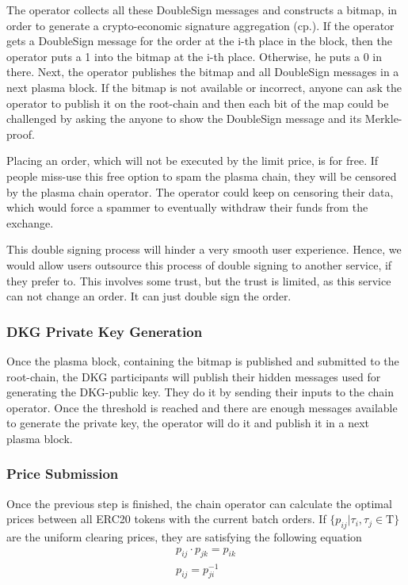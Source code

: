 \documentclass[11pt,parskip=full]{scrartcl}%
\newcommand{\Tau}{\mathrm{T}}
\begin{document}
The operator collects all these DoubleSign messages and constructs a bitmap, in order to generate a crypto-economic signature aggregation (cp.\cite{sig}). 
If the operator gets a DoubleSign message for the order at the i-th place in the block, then the operator puts a 1 into the bitmap at the i-th place. 
Otherwise, he puts a 0 in there.
Next, the operator publishes the bitmap and all DoubleSign messages in a next plasma block. 
If the bitmap is not available or incorrect, anyone can ask the operator to publish it on the root-chain and then each bit of the map could be challenged by asking the anyone to show the DoubleSign message and its Merkle-proof. 

Placing an order, which will not be executed by the limit price, is for free. 
If people miss-use this free option to spam the plasma chain, they will be censored by the plasma chain operator. 
The operator could keep on censoring their data, which would force a spammer to eventually withdraw their funds from the exchange. 

This double signing process will hinder a very smooth user experience. 
Hence, we would allow users outsource this process of double signing to another service, if they prefer to. 
This involves some trust, but the trust is limited, as this service can not change an order. It can just double sign the order. 

\subsubsection{DKG Private Key Generation}
Once the plasma block, containing the bitmap is published and submitted to the root-chain, the DKG participants will publish their hidden messages used for generating the DKG-public key. 
They do it by sending their inputs to the chain operator.
Once the threshold is reached and there are enough messages available to generate the private key, the operator will do it and publish it in a next plasma block. 

\subsubsection{Price Submission}
Once the previous step is finished, the chain operator can calculate the optimal prices between all ERC20 tokens with the current batch orders. 
If $\{p_{ij}| \tau_i, \tau_j \in \Tau \}$  are the uniform clearing prices, they are satisfying the following equation
\begin{align}
    \label{eq:arbitrage_freeness}
  p_{ij} \cdot p_{jk} = p_{ik}\\
  p_{ij} = p_{ji}^{-1}
\end{align}
\end{document}
